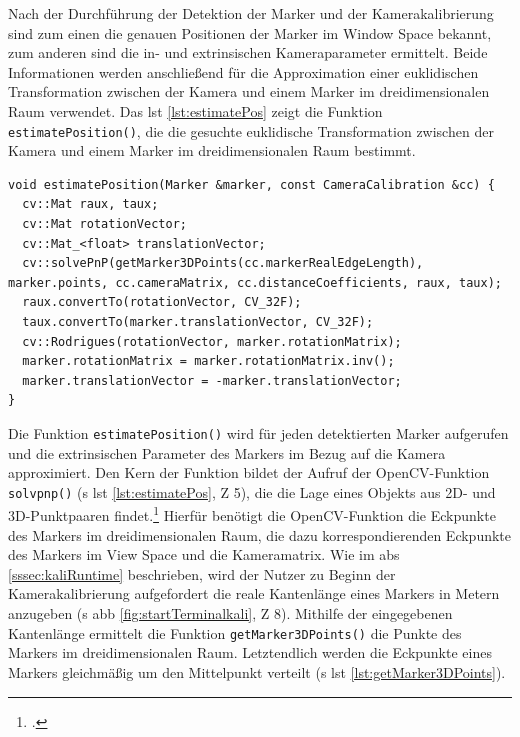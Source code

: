 \noindent Nach der Durchführung der Detektion der Marker und der Kamerakalibrierung sind zum einen die genauen Positionen der Marker im Window Space bekannt, zum anderen sind die in- und extrinsischen Kameraparameter ermittelt. Beide Informationen werden anschließend für die Approximation einer euklidischen Transformation zwischen der Kamera und einem Marker im dreidimensionalen Raum verwendet. Das \acs{lst} \ref{lst:estimatePos} zeigt die Funktion \texttt{estimatePosition()}, die die gesuchte euklidische Transformation zwischen der Kamera und einem Marker im dreidimensionalen Raum bestimmt. 

\begin{lstlisting}[caption={Die Funktion \texttt{detectormarkerbased.cpp/estimatePosition();} bestimmt die Lage eines Markers im dreidimensionalen Raum im Bezug auf die Kamera}, label={lst:estimatePos}]
void estimatePosition(Marker &marker, const CameraCalibration &cc) {
  cv::Mat raux, taux;
  cv::Mat rotationVector;
  cv::Mat_<float> translationVector;
  cv::solvePnP(getMarker3DPoints(cc.markerRealEdgeLength), marker.points, cc.cameraMatrix, cc.distanceCoefficients, raux, taux);
  raux.convertTo(rotationVector, CV_32F);
  taux.convertTo(marker.translationVector, CV_32F);
  cv::Rodrigues(rotationVector, marker.rotationMatrix);
  marker.rotationMatrix = marker.rotationMatrix.inv();
  marker.translationVector = -marker.translationVector;
}
\end{lstlisting}

\noindent Die Funktion \texttt{estimatePosition()} wird für jeden detektierten Marker aufgerufen und die extrinsischen Parameter des Markers im Bezug auf die Kamera approximiert. Den Kern der Funktion bildet der Aufruf der OpenCV-Funktion \texttt{solvpnp()} (\acs{s} \acs{lst} \ref{lst:estimatePos}, \acs{Z} 5), die die Lage eines Objekts aus 2D- und 3D-Punktpaaren findet.\footcite{opencvsolvePnP} Hierfür benötigt die OpenCV-Funktion die Eckpunkte des Markers im dreidimensionalen Raum, die dazu korrespondierenden Eckpunkte des Markers im View Space und die Kameramatrix. Wie im \acs{abs} \ref{sssec:kaliRuntime} beschrieben, wird der Nutzer zu Beginn der Kamerakalibrierung aufgefordert die reale Kantenlänge eines Markers in Metern anzugeben (\acs{s} \acs{abb} \ref{fig:startTerminalkali}, \acs{Z} 8). Mithilfe der eingegebenen Kantenlänge ermittelt die Funktion \texttt{getMarker3DPoints()} die Punkte des Markers im dreidimensionalen Raum. Letztendlich werden die Eckpunkte eines Markers gleichmäßig um den Mittelpunkt verteilt (\acs{s} \acs{lst} \ref{lst:getMarker3DPoints}).


